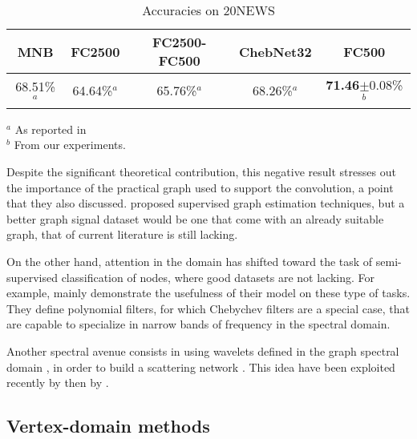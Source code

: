 \begin{table}[H]
  \caption{Accuracies on 20NEWS}
  \begin{center}
    \bgroup
    \def\arraystretch{1.5}%
    \begin{tabular}{|c|c|c|c|c|}
      \hline
      MNB & FC2500 & FC2500-FC500 & ChebNet32 & FC500\\
      \hline
      68.51\%$^a$ & 64.64\%$^a$ & 65.76\%$^a$ & 68.26\%$^a$ & \textbf{71.46}$\pm$0.08\%$^b$\\
      \hline
    \end{tabular}
    \egroup
  \end{center}
\begin{flushleft}
\footnotesize{
$^a$ As reported in \cite{defferrard2016convolutional}\\
$^b$ From our experiments.
}
\end{flushleft}
  \label{tab:20}
\end{table}

Despite the significant theoretical contribution, this negative result stresses out the importance of the practical graph used to support the convolution, a point that they also discussed. \cite{henaff2015deep} proposed supervised graph estimation techniques, but a better graph signal dataset would be one that come with an already suitable graph, that of current literature is still lacking.

On the other hand, attention in the domain has shifted toward the task of semi-supervised classification of nodes, where good datasets are not lacking. For example, \cite{levie2017cayleynets} mainly demonstrate the usefulness of their model on these type of tasks. They define polynomial filters, for which Chebychev filters are a special case, that are capable to specialize in narrow bands of frequency in the spectral domain.

Another spectral avenue consists in using wavelets defined in the graph spectral domain \citep{hammond2011wavelets}, in order to build a scattering network \citep{bruna2013invariant}. This idea have been exploited recently by \cite{zou2018Graph} then by \cite{gama2018Diffusion}.

\subsection{Vertex-domain methods}
\label{sec:vert}

